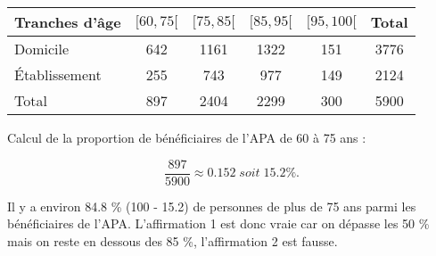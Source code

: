 \documentclass[a4paper,11pt]{exam}
\begin{document}
\begin{questions}
\begin{parts}
		\begin{tabular}{|@{\ }l@{\ }|@{\ }c@{\ }|@{\ }c@{\ }|@{\ }c@{\ }|@{\ }c@{\ }|@{\ }c@{\ }|}
			\hline
			Tranches d'âge  & $[60 , 75[$ & $[75, 85[$ & $[85, 95[$ & $[95, 100[$ & Total \\ \hline
			Domicile        & 642         & 1161       & 1322       & 151         & 3776  \\ \hline
			\'Etablissement & 255         & 743        & 977        & 149         & 2124  \\ \hline
			Total           & 897         & 2404       & 2299       & 300         & 5900  \\ \hline
		\end{tabular}
	\end{parts}

	\question 
	
	Calcul de la proportion de bénéficiaires de l'APA de 60 à 75 ans :
	
	\begin{equation*}
		\frac{897}{5900} \approx \num{0.152} \; soit \; \num{15.2} \%.
	\end{equation*} 
	
	Il y a environ \num{84.8} \% (\num{100} - \num{15.2}) de personnes de plus de 75 ans parmi les bénéficiaires de l'APA. L'affirmation 1 est donc vraie car on dépasse les 50 \% mais on reste en dessous des 85 \%, l'affirmation 2 est fausse.
	
	\question 
	
\end{questions}
\end{document}
